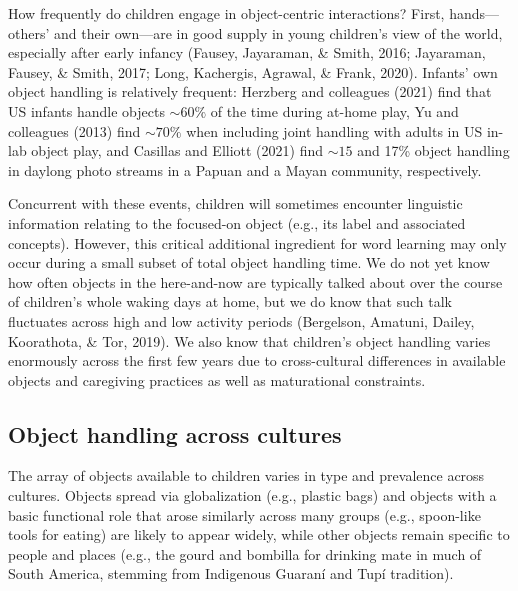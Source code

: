 \documentclass[10pt, letterpaper]{article}
\begin{document}
How frequently do children engage in object-centric interactions? First,
hands---others' and their own---are in good supply in young children's
view of the world, especially after early infancy (Fausey, Jayaraman, \&
Smith, 2016; Jayaraman, Fausey, \& Smith, 2017; Long, Kachergis,
Agrawal, \& Frank, 2020). Infants' own object handling is relatively
frequent: Herzberg and colleagues (2021) find that US infants handle
objects \({\sim}60\%\) of the time during at-home play, Yu and
colleagues (2013) find \({\sim}70\%\) when including joint handling with
adults in US in-lab object play, and Casillas and Elliott (2021) find
\({\sim}15\) and 17\% object handling in daylong photo streams in a
Papuan and a Mayan community, respectively.

Concurrent with these events, children will sometimes encounter
linguistic information relating to the focused-on object (e.g., its
label and associated concepts). However, this critical additional
ingredient for word learning may only occur during a small subset of
total object handling time. We do not yet know how often objects in the
here-and-now are typically talked about over the course of children's
whole waking days at home, but we do know that such talk fluctuates
across high and low activity periods (Bergelson, Amatuni, Dailey,
Koorathota, \& Tor, 2019). We also know that children's object handling
varies enormously across the first few years due to cross-cultural
differences in available objects and caregiving practices as well as
maturational constraints.

\hypertarget{object-handling-across-cultures}{%
\subsection{Object handling across
cultures}\label{object-handling-across-cultures}}

The array of objects available to children varies in type and prevalence
across cultures. Objects spread via globalization (e.g., plastic bags)
and objects with a basic functional role that arose similarly across
many groups (e.g., spoon-like tools for eating) are likely to appear
widely, while other objects remain specific to people and places (e.g.,
the gourd and bombilla for drinking mate in much of South America,
stemming from Indigenous Guaraní and Tupí tradition).
\end{document}
